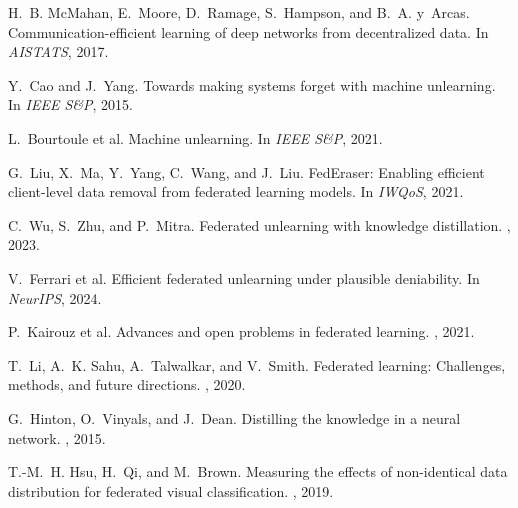 \documentclass[10pt,twocolumn]{article}
\begin{document}
\begin{thebibliography}{10}

H.~B. McMahan, E.~Moore, D.~Ramage, S.~Hampson, and B.~A. y~Arcas.
\newblock Communication-efficient learning of deep networks from decentralized data.
\newblock In {\em AISTATS}, 2017.

Y.~Cao and J.~Yang.
\newblock Towards making systems forget with machine unlearning.
\newblock In {\em IEEE S\&P}, 2015.

L.~Bourtoule et al.
\newblock Machine unlearning.
\newblock In {\em IEEE S\&P}, 2021.

G.~Liu, X.~Ma, Y.~Yang, C.~Wang, and J.~Liu.
\newblock FedEraser: Enabling efficient client-level data removal from federated learning models.
\newblock In {\em IWQoS}, 2021.

C.~Wu, S.~Zhu, and P.~Mitra.
\newblock Federated unlearning with knowledge distillation.
, 2023.

V.~Ferrari et al.
\newblock Efficient federated unlearning under plausible deniability.
\newblock In {\em NeurIPS}, 2024.

P.~Kairouz et al.
\newblock Advances and open problems in federated learning.
, 2021.

T.~Li, A.~K. Sahu, A.~Talwalkar, and V.~Smith.
\newblock Federated learning: Challenges, methods, and future directions.
, 2020.

G.~Hinton, O.~Vinyals, and J.~Dean.
\newblock Distilling the knowledge in a neural network.
, 2015.

T.-M.~H. Hsu, H.~Qi, and M.~Brown.
\newblock Measuring the effects of non-identical data distribution for federated visual classification.
, 2019.

\end{thebibliography}
\end{document}
